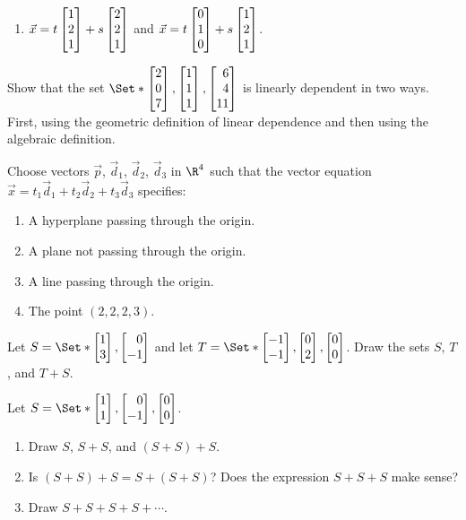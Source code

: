\begin{exercises}
\begin{problist}
\begin{enumerate}
			\item $\vec x = t\mat{1\\2\\1}+ s\mat{2\\2\\1}$ and $\vec
				x = t\mat{0\\1\\0}+ s\mat{1\\2\\1}$.
		\end{enumerate}
		
		\prob Show that the set $\Set*{\mat{2\\0\\7},\mat{1\\1\\1},\mat{6\\4\\11}}$
		is linearly dependent in two ways. First, using the geometric definition of linear dependence
		and then using the algebraic definition.

		\prob Choose vectors $\vec p$, $\vec d_{1}$, $\vec d_{2}$,
		$\vec d_{3}$ in $\R^{4}$ such that the vector equation
		$\vec x = t_{1}\vec d_{1} + t_{2}\vec d_{2} + t_{3}\vec d_{3}$ specifies:
		\begin{enumerate}
			\item A hyperplane passing through the origin.

			\item A plane not passing through the origin.

			\item A line passing through the origin.

			\item The point $(2,2,2,3)$.
		\end{enumerate}

		\prob Let $S=\Set*{\mat{1\\3},\mat{0\\-1}}$ and let $T=\Set*{\mat{-1\\-1},\mat{0\\2},\mat{0\\0}}$. Draw
		the sets $S$, $T$, and $T+S$.

		\prob Let $S=\Set*{\mat{1\\1},\mat{0\\-1}, \mat{0\\0}}$. 
		\begin{enumerate}
			\item 
				Draw $S$, $S+S$, and $(S+S)+S$.
			\item Is $(S+S)+S=S+(S+S)$? Does the expression $S+S+S$ make sense?
			\item Draw $S+S+S+S+\cdots$.
		\end{enumerate}


\end{problist}
\end{exercises}

